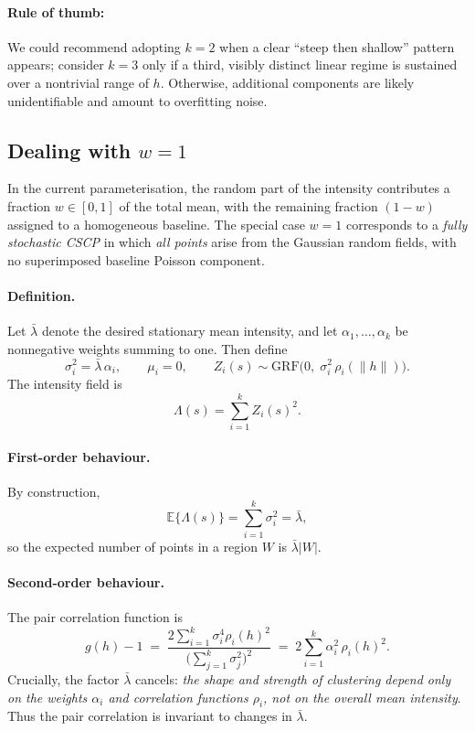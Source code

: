 \documentclass[11pt]{article}
\begin{document}
\paragraph{Rule of thumb:}
We could recommend adopting $k=2$ when a clear ``steep then shallow'' pattern appears; 
consider $k=3$ only if a third, visibly distinct linear regime is sustained over a nontrivial range of $h$. 
Otherwise, additional components are likely unidentifiable and amount to overfitting noise.


\subsection{Dealing with $w=1$}

In the current parameterisation, the random part of the
intensity contributes a fraction $w \in [0,1]$ of the total mean, with the
remaining fraction $(1-w)$ assigned to a homogeneous baseline. The special case
$w=1$ corresponds to a \emph{fully stochastic CSCP} in which \emph{all points}
arise from the Gaussian random fields, with no superimposed baseline Poisson
component.

\paragraph{Definition.}
Let $\bar\lambda$ denote the desired stationary mean intensity, and let
$\alpha_1,\ldots,\alpha_k$ be nonnegative weights summing to one. Then define
\[
\sigma_i^2 = \bar\lambda \,\alpha_i, 
\qquad \mu_i = 0,
\qquad
Z_i(s) \sim \text{GRF}\big(0,\; \sigma_i^2\,\rho_i(\|h\|)\big).
\]
The intensity field is
\[
\Lambda(s) = \sum_{i=1}^k Z_i(s)^2.
\]

\paragraph{First-order behaviour.}
By construction,
\[
\mathbb E\{\Lambda(s)\} = \sum_{i=1}^k \sigma_i^2 = \bar\lambda,
\]
so the expected number of points in a region $W$ is $\bar\lambda |W|$.

\paragraph{Second-order behaviour.}
The pair correlation function is
\[
g(h)-1 \;=\; \frac{2\sum_{i=1}^k \sigma_i^4 \rho_i(h)^2}
{\big(\sum_{j=1}^k \sigma_j^2\big)^2}
\;=\; 2\sum_{i=1}^k \alpha_i^2\,\rho_i(h)^2.
\]
Crucially, the factor $\bar\lambda$ cancels: \emph{the shape and strength of
	clustering depend only on the weights $\alpha_i$ and correlation functions
	$\rho_i$, not on the overall mean intensity}. Thus the pair correlation is
invariant to changes in $\bar\lambda$.
\end{document}
